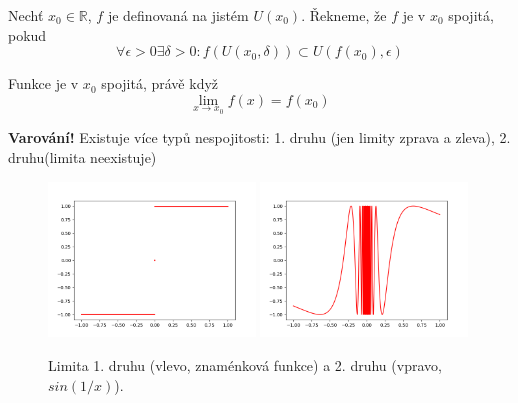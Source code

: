 \begin{definition}[name=Spojitost, label=D-continuity]
    Nechť $x_0\in\mathbb{R}$, $f$ je definovaná na jistém $U(x_0)$. Řekneme, že $f$ je v $x_0$
    spojitá, pokud
    \begin{equation}
        \forall\epsilon>0\exists\delta>0:f\left(U(x_0,\delta)\right)\subset
            U\left(f(x_0),\epsilon\right)
    \end{equation}
\end{definition}

\begin{theorem}[name=Limita a spojitost, label=T-limitAndContinuity]
    Funkce je v $x_0$ spojitá, právě když
    \begin{equation}
        \lim_{x\to x_0}f(x)=f(x_0)
    \end{equation}
\end{theorem}
\textbf{Varování!} Existuje více typů nespojitosti: 1. druhu (jen limity zprava a zleva),
2. druhu(limita neexistuje)
\begin{figure}[ht!]
    \begin{center}
        \includegraphics[width=0.49\textwidth,keepaspectratio]{../img/chapter2/typesOfDiscontinuity_1.png}
        \includegraphics[width=0.49\textwidth,keepaspectratio]{../img/chapter2/typesOfDiscontinuity_2.png}
        \caption{Limita 1. druhu (vlevo, znaménková funkce) a 2. druhu (vpravo, $sin(1/x)$).}
    \end{center}
\end{figure}\FloatBarrier
